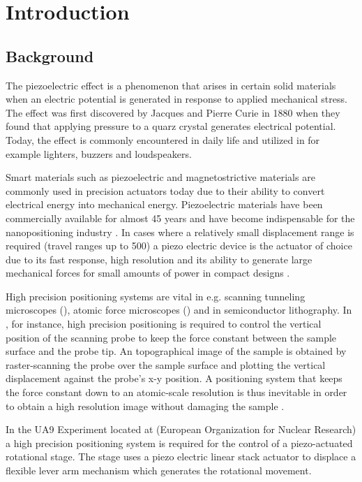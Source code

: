 \chapter{Introduction}\label{cha:intro}

\section{Background}
The piezoelectric effect is a phenomenon that arises in certain solid materials when an electric potential is generated in response to applied mechanical stress. The effect was first discovered by Jacques and Pierre Curie in 1880 when they found that applying pressure to a quarz crystal generates electrical potential. Today, the effect is commonly encountered in daily life and utilized in for example lighters, buzzers and loudspeakers.

Smart materials such as piezoelectric and magnetostrictive materials are commonly used in precision actuators today due to their ability to convert electrical energy into mechanical energy. Piezoelectric materials have been commercially available for almost 45 years and have become indispensable for the nanopositioning industry \citep{Piezo:2008}. In cases where a relatively small displacement range is required (travel ranges up to \unit{500}{\micro\meter}) a piezo electric device is the actuator of choice due to its fast response, high resolution and its ability to generate large mechanical forces for small amounts of power in compact designs \citep{SurveyOfControlIssues:2007}. 

High precision positioning systems are vital in e.g. scanning tunneling microscopes (\abbrSTM), atomic force microscopes (\abbrAFM) and in semiconductor lithography. In \abbrAFM, for instance, high precision positioning is required to control the vertical position of the scanning probe to keep the force constant between the sample surface and the probe tip. An topographical image of the sample is obtained by raster-scanning the probe over the sample surface and plotting the vertical displacement against the probe's x-y position. A positioning system that keeps the force constant down to an atomic-scale resolution is thus inevitable in order to obtain a high resolution image without damaging the sample \citep{SurveyOfControlIssues:2007}.

In the UA9 Experiment located at \abbrCERN (European Organization for Nuclear Research) a high precision positioning system is required for the control of a piezo-actuated rotational stage. The stage uses a piezo electric linear stack actuator to displace a flexible lever arm mechanism which generates the rotational movement.

